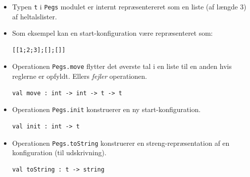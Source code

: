 \documentclass[rgb]{beamer}
\begin{document}
\begin{frame}[fragile]
\begin{footnotesize}

  \vspace{1ex}

  \begin{itemize}
  \item Typen \lstinline{t} i \lstinline{Pegs} modulet er internt
    repræsentereret som en liste (af længde 3) af heltalslister.
  \vspace{1ex}

  \item Som eksempel kan en start-konfiguration være repræsenteret som:
\begin{lstlisting}[numbers=none,frame=none,mathescape]
  [[1;2;3];[];[]]
\end{lstlisting}
  \vspace{1ex}

\item Operationen \lstinline{Pegs.move} flytter det øverste tal i en
  liste til en anden hvis reglerne er opfyldt. Ellers \emph{fejler}
  operationen.
\begin{lstlisting}[numbers=none,frame=none,mathescape]
  val move : int -> int -> t -> t
\end{lstlisting}
  \vspace{1ex}

\item Operationen \lstinline{Pegs.init} konstruerer en ny
  start-konfiguration.
\begin{lstlisting}[numbers=none,frame=none,mathescape]
  val init : int -> t
\end{lstlisting}
  \vspace{1ex}

\item Operationen \lstinline{Pegs.toString} konstruerer en
  streng-repræsentation af en konfiguration (til udskrivning).
\begin{lstlisting}[numbers=none,frame=none,mathescape]
  val toString : t -> string
\end{lstlisting}
  \end{itemize}
\end{footnotesize}
\end{frame}
\end{document}
